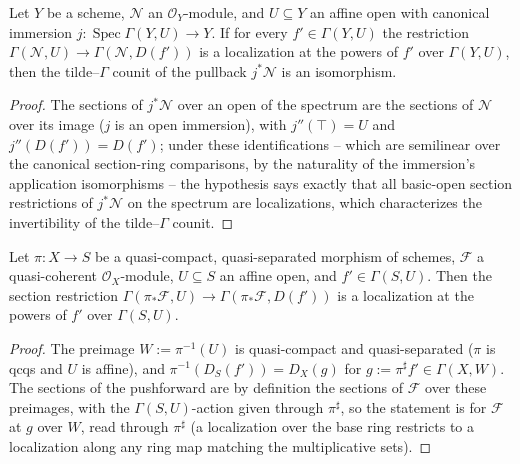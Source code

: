 \begin{lemma}
  \label{lem:fromTildeGamma_pullback_fromSpec_converse}
  \leanok
  Let $Y$ be a scheme, $\mathcal{N}$ an $\mathcal{O}_Y$-module, and
  $U \subseteq Y$ an affine open with canonical immersion
  $j : \operatorname{Spec} \Gamma(Y, U) \to Y$. If for every
  $f' \in \Gamma(Y, U)$ the restriction
  $\Gamma(\mathcal{N}, U) \to \Gamma(\mathcal{N}, D(f'))$ is a localization at
  the powers of $f'$ over $\Gamma(Y, U)$, then the tilde--$\Gamma$ counit of
  the pullback $j^* \mathcal{N}$ is an isomorphism.
\end{lemma}
\begin{proof}
  \leanok
  The sections of $j^* \mathcal{N}$ over an open of the spectrum are the
  sections of $\mathcal{N}$ over its image ($j$ is an open immersion), with
  $j''(\top) = U$ and $j''(D(f')) = D(f')$; under these identifications --
  which are semilinear over the canonical section-ring comparisons, by the
  naturality of the immersion's application isomorphisms -- the hypothesis
  says exactly that all basic-open section restrictions of $j^* \mathcal{N}$
  on the spectrum are localizations, which characterizes the invertibility of
  the tilde--$\Gamma$ counit.
\end{proof}

\begin{lemma}
  \label{lem:pushforward_section_localization}
  \leanok
  Let $\pi : X \to S$ be a quasi-compact, quasi-separated morphism of
  schemes, $\mathcal{F}$ a quasi-coherent $\mathcal{O}_X$-module,
  $U \subseteq S$ an affine open, and $f' \in \Gamma(S, U)$. Then the section
  restriction
  $\Gamma(\pi_* \mathcal{F}, U) \to \Gamma(\pi_* \mathcal{F}, D(f'))$ is a
  localization at the powers of $f'$ over $\Gamma(S, U)$.
\end{lemma}
\begin{proof}
  \leanok
  The preimage $W := \pi^{-1}(U)$ is quasi-compact and quasi-separated
  ($\pi$ is qcqs and $U$ is affine), and
  $\pi^{-1}(D_S(f')) = D_X(g)$ for $g := \pi^\sharp f' \in \Gamma(X, W)$. The
  sections of the pushforward are by definition the sections of
  $\mathcal{F}$ over these preimages, with the $\Gamma(S, U)$-action given
  through $\pi^\sharp$, so the statement is
   for $\mathcal{F}$ at $g$ over $W$,
  read through $\pi^\sharp$ (a localization over the base ring restricts to a
  localization along any ring map matching the multiplicative sets).
\end{proof}

